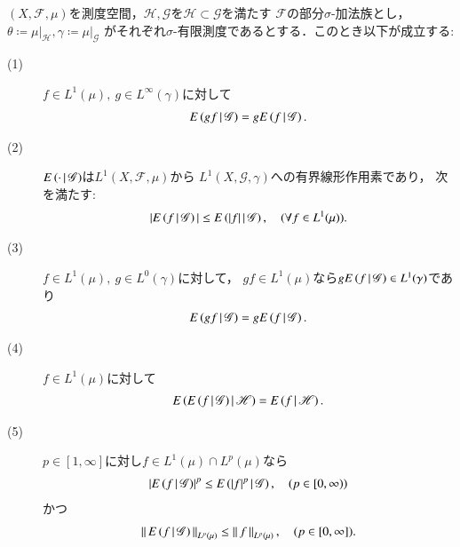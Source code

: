	\begin{screen}
		\begin{thm}[条件付き期待値の性質]\label{thm:properties_of_conditional_expectations}
			$(X,\mathscr{F},\mu)$を測度空間，$\mathscr{H},\mathscr{G}$を$\mathscr{H} \subset \mathscr{G}$を満たす
			$\mathscr{F}$の部分$\sigma$-加法族とし，$\theta \coloneqq \left. \mu \right|_{\mathscr{H}},
			\gamma \coloneqq \left. \mu \right|_{\mathscr{G}}$
			がそれぞれ$\sigma$-有限測度であるとする．このとき以下が成立する:
			\begin{description}
				\item[(1)] $f \in L^1(\mu),\ g \in L^\infty(\gamma)$に対して
					\begin{align}
						E\left( gf \, \middle|\, \mathscr{G} \right) = gE\left( f \, \middle|\, \mathscr{G} \right).
						\label{eq:thm_properties_of_conditional_expectations_1}
					\end{align}
					
				\item[(2)] $E\left( \cdot \, \middle|\, \mathscr{G} \right)$は$L^1(X,\mathscr{F},\mu)$から
					$L^1\left(X,\mathscr{G},\gamma\right)$への有界線形作用素であり，
					次を満たす:
					\begin{align}
						|E\left( f \, \middle|\, \mathscr{G} \right)| \leq E\left( |f| \, \middle|\, \mathscr{G} \right),
						\quad (\forall f \in L^1(\mu)).
						\label{eq:thm_properties_of_conditional_expectations_2}
					\end{align}
				
				\item[(3)] $f \in L^1(\mu),\ g \in L^0(\gamma)$に対して，
					$gf \in L^1(\mu)$なら$g E\left( f \, \middle|\, \mathscr{G} \right) \in L^1(\gamma)$であり
					\begin{align}
						E\left( gf \, \middle|\, \mathscr{G} \right) = gE\left( f \, \middle|\, \mathscr{G} \right).
						\label{eq:thm_properties_of_conditional_expectations_4}
					\end{align}
					
				\item[(4)] $f \in L^1(\mu)$に対して
					\begin{align}
						E\left( E\left( f \, \middle|\, \mathscr{G} \right) \, \middle|\, \mathscr{H} \right) = E\left( f \, \middle|\, \mathscr{H} \right).
					\end{align}
					
				\item[(5)] $p \in [1,\infty]$に対し$f \in L^1(\mu) \cap L^p(\mu)$なら
					\begin{align}
						\left| E\left( f \, \middle|\, \mathscr{G} \right) \right|^p
						\leq E\left( |f|^p \, \middle|\, \mathscr{G} \right),\quad (p \in [0,\infty))
					\end{align}
					かつ
					\begin{align}
						\left\|\, E\left( f \, \middle|\, \mathscr{G} \right)\, \right\|_{L^p(\mu)}
						\leq \left\|\, f\, \right\|_{L^p(\mu)},\quad (p \in [0,\infty]).
						\label{eq:thm_properties_of_conditional_expectations_3}
					\end{align}
			\end{description}
		\end{thm}
	\end{screen}
	
